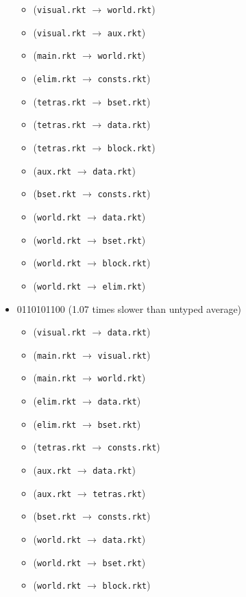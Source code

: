 \documentclass{article}
\newcommand{\mono}[1]{\texttt{#1}}
\begin{document}
\begin{itemize}
\begin{itemize}
  \item (\mono{visual.rkt} $\rightarrow$ \mono{world.rkt})
  \item (\mono{visual.rkt} $\rightarrow$ \mono{aux.rkt})
  \item (\mono{main.rkt} $\rightarrow$ \mono{world.rkt})
  \item (\mono{elim.rkt} $\rightarrow$ \mono{consts.rkt})
  \item (\mono{tetras.rkt} $\rightarrow$ \mono{bset.rkt})
  \item (\mono{tetras.rkt} $\rightarrow$ \mono{data.rkt})
  \item (\mono{tetras.rkt} $\rightarrow$ \mono{block.rkt})
  \item (\mono{aux.rkt} $\rightarrow$ \mono{data.rkt})
  \item (\mono{bset.rkt} $\rightarrow$ \mono{consts.rkt})
  \item (\mono{world.rkt} $\rightarrow$ \mono{data.rkt})
  \item (\mono{world.rkt} $\rightarrow$ \mono{bset.rkt})
  \item (\mono{world.rkt} $\rightarrow$ \mono{block.rkt})
  \item (\mono{world.rkt} $\rightarrow$ \mono{elim.rkt})
  \end{itemize}
\item 0110101100 (1.07 times slower than untyped average)
  \begin{itemize}
  \item (\mono{visual.rkt} $\rightarrow$ \mono{data.rkt})
  \item (\mono{main.rkt} $\rightarrow$ \mono{visual.rkt})
  \item (\mono{main.rkt} $\rightarrow$ \mono{world.rkt})
  \item (\mono{elim.rkt} $\rightarrow$ \mono{data.rkt})
  \item (\mono{elim.rkt} $\rightarrow$ \mono{bset.rkt})
  \item (\mono{tetras.rkt} $\rightarrow$ \mono{consts.rkt})
  \item (\mono{aux.rkt} $\rightarrow$ \mono{data.rkt})
  \item (\mono{aux.rkt} $\rightarrow$ \mono{tetras.rkt})
  \item (\mono{bset.rkt} $\rightarrow$ \mono{consts.rkt})
  \item (\mono{world.rkt} $\rightarrow$ \mono{data.rkt})
  \item (\mono{world.rkt} $\rightarrow$ \mono{bset.rkt})
  \item (\mono{world.rkt} $\rightarrow$ \mono{block.rkt})

\end{itemize}
\end{itemize}
\end{document}

